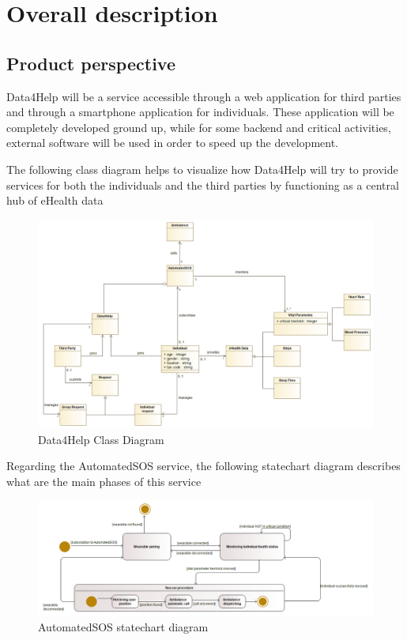 \chapter{Overall description}
\section{Product perspective}
Data4Help will be a service accessible through a web application for third parties and through a smartphone application for individuals. These application will be completely developed ground up, while for some backend and critical activities, external software will be used in order to speed up the development.


The following class diagram helps to visualize how Data4Help will try to provide services for both the individuals and the third parties by functioning as a central hub of eHealth data

\begin{figure}[H]
  \includegraphics[width=1.05\linewidth]{resources/UML/Data4HelpClassDiagram.png}
  \caption{Data4Help Class Diagram}
  \label{fig: Data4Help Class diagram}
\end{figure}

Regarding the AutomatedSOS service, the following statechart diagram describes what are the main phases of this service

\begin{figure}[H]
  \includegraphics[width=1.10\linewidth]{resources/UML/AutomatedSOSstatechart.png}
  \caption{AutomatedSOS statechart diagram}
  \label{fig: AutoamtedSOS statechart diagram}
\end{figure}


